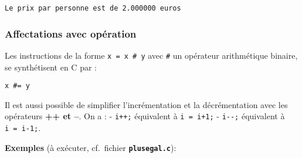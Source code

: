 \documentclass[11pt]{article}
\begin{document}
    \begin{Verbatim}[commandchars=\\\{\}]
Le prix par personne est de 2.000000 euros
    \end{Verbatim}

    \hypertarget{affectations-avec-opuxe9ration}{%
\subsubsection{Affectations avec
opération}\label{affectations-avec-opuxe9ration}}

Les instructions de la forme \texttt{x\ =\ x\ \#\ y} avec \texttt{\#} un
opérateur arithmétique binaire, se synthétisent en C par :

\texttt{x\ \#=\ y}

Il est aussi possible de simplifier l'incrémentation et la
décrémentation avec les opérateurs \textbf{++ et --}. On a : -
\texttt{i++;} équivalent à \texttt{i\ =\ i+1;} - \texttt{i-\/-;}
équivalent à \texttt{i\ =\ i-1;}.

\textbf{Exemples} (à exécuter, cf.~fichier
\textbf{\texttt{plusegal.c}}):
\end{document}
